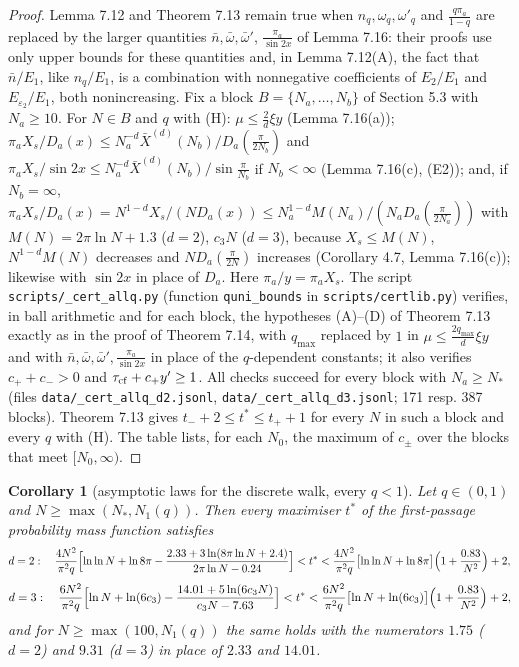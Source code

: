 \documentclass[11pt,a4paper]{article}
\newtheorem{corollary}[theorem]{Corollary}
\theoremstyle{definition}
\theoremstyle{remark}
\begin{document}
\begin{proof}
Lemma 7.12 and Theorem 7.13 remain true when $n_q,\omega_q,\omega'_q$ and $\frac{q\pi_a}{1-q}$ are replaced by the larger quantities $\bar n,\bar\omega,\bar\omega'$, $\frac{\pi_a}{\sin2x}$ of Lemma 7.16: their proofs use only upper bounds for these quantities and, in Lemma 7.12(A), the fact that $\bar n/E_1$, like $n_q/E_1$, is a combination with nonnegative coefficients of $E_2/E_1$ and $E_{\varepsilon_2}/E_1$, both nonincreasing. Fix a block $B=\{N_a,\dots,N_b\}$ of Section 5.3 with $N_a\ge10$. For $N\in B$ and $q$ with (H): $\mu\le\frac2d\xi y$ (Lemma 7.16(a)); $\pi_a X_s/D_a(x)\le N_a^{-d}\bar X^{(d)}(N_b)/D_a(\frac{\pi}{2N_b})$ and $\pi_aX_s/\sin2x\le N_a^{-d}\bar X^{(d)}(N_b)/\sin\frac{\pi}{N_b}$ if $N_b<\infty$ (Lemma 7.16(c), (E2)); and, if $N_b=\infty$, $\pi_aX_s/D_a(x)=N^{1-d}X_s/(ND_a(x))\le N_a^{1-d}M(N_a)/(N_aD_a(\frac{\pi}{2N_a}))$ with $M(N)=2\pi\ln N+1.3$ ($d=2$), $c_3N$ ($d=3$), because $X_s\le M(N)$, $N^{1-d}M(N)$ decreases and $ND_a(\frac\pi{2N})$ increases (Corollary 4.7, Lemma 7.16(c)); likewise with $\sin2x$ in place of $D_a$. Here $\pi_a/y=\pi_aX_s$. The script \texttt{scripts/\_\allowbreak cert\_\allowbreak allq.py} (function \texttt{quni\_\allowbreak bounds} in \texttt{scripts/\allowbreak certlib.py}) verifies, in ball arithmetic and for each block, the hypotheses (A)–(D) of Theorem 7.13 exactly as in the proof of Theorem 7.14, with $q_{\max}$ replaced by $1$ in $\mu\le\frac{2q_{\max}}{d}\xi y$ and with $\bar n,\bar\omega,\bar\omega',\frac{\pi_a}{\sin2x}$ in place of the $q$-dependent constants; it also verifies $c_++c_->0$ and $\tau_{\rm cf}+c_+y'\ge1$. All checks succeed for every block with $N_a\ge N_*$ (files \texttt{data/\_\allowbreak cert\_\allowbreak allq\_\allowbreak d2.jsonl}, \texttt{data/\_\allowbreak cert\_\allowbreak allq\_\allowbreak d3.jsonl}; 171 resp. 387 blocks). Theorem 7.13 gives $t_-+2\le t^*\le t_++1$ for every $N$ in such a block and every $q$ with (H). The table lists, for each $N_0$, the maximum of $c_\pm$ over the blocks that meet $[N_0,\infty)$.
\end{proof}

\begin{corollary}[{asymptotic laws for the discrete walk, every $q<1$}]
Let $q\in(0,1)$ and $N\ge\max(N_*,N_1(q))$. Then every maximiser $t^*$ of the first-passage probability mass function satisfies
\begin{equation*}
d=2:\quad \frac{4N^2}{\pi^2q}\Bigl[\ln\ln N+\ln8\pi-\frac{2.33+3\ln(8\pi\ln N+2.4)}{2\pi\ln N-0.24}\Bigr]<t^*<\frac{4N^2}{\pi^2q}\bigl[\ln\ln N+\ln8\pi\bigr]\Bigl(1+\frac{0.83}{N^2}\Bigr)+2,
\end{equation*}
\begin{equation*}
d=3:\quad \frac{6N^2}{\pi^2q}\Bigl[\ln N+\ln(6c_3)-\frac{14.01+5\ln(6c_3N)}{c_3N-7.63}\Bigr]<t^*<\frac{6N^2}{\pi^2q}\bigl[\ln N+\ln(6c_3)\bigr]\Bigl(1+\frac{0.83}{N^2}\Bigr)+2,
\end{equation*}
and for $N\ge\max(100,N_1(q))$ the same holds with the numerators $1.75$ ($d=2$) and $9.31$ ($d=3$) in place of $2.33$ and $14.01$.
\end{corollary}
\end{document}
